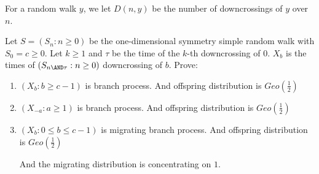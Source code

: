 \documentclass{ctexart}
\newif\ifpreface
\begin{document}
\large
\setlength{\baselineskip}{1.2em}
\ifpreface
  
\else
\fi
{}
For a random walk \(y\), we let \(D(n,y)\) be the number of downcrossings of \(y\) over \(n\).


\begin{problem}\label{pro:1}
  Let \(S=(S_n:n \geq 0)\) be the one-dimensional symmetry simple random walk with \(S_0=c \geq 0\).
  Let \(k \geq 1\) and \(\tau\) be the time of the \(k\)-th downcrossing of \(0\).
  \(X_b\) is the times of \((S_{n \AND \tau}:n \geq 0)\) downcrossing of \(b\). Prove:
  \begin{enumerate}
    \item \((X_b:b \geq c-1)\) is branch process.
      And offspring distribution is \(Geo(\frac{1}{2})\)

    \item \((X_{-a}:a \geq 1)\) is branch process.
      And offspring distribution is \(Geo(\frac{1}{2})\)

    \item \((X_b:0 \leq b \leq c-1)\) is migrating branch process.
      And offspring distribution is \(Geo(\frac{1}{2})\)

      And the migrating distribution is concentrating on \(1\).

  \end{enumerate}
\end{problem}
\end{document}
